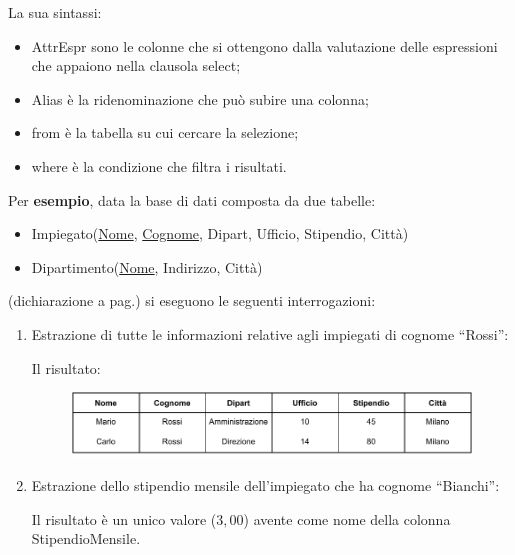 \documentclass[a4paper]{article}
\newcommand{\dquotes}[1]{``#1''}
\begin{document}
	\noindent
	La sua sintassi:
	
	\begin{itemize}
		\item \textsf{AttrEspr} sono le colonne che si ottengono dalla valutazione delle espressioni che appaiono nella clausola \textsf{select};
		\item \textsf{Alias} è la ridenominazione che può subire una colonna;
		\item \textsf{from} è la tabella su cui cercare la selezione;
		\item \textsf{where} è la condizione che filtra i risultati.
	\end{itemize}
	Per \textcolor{Green4}{\textbf{esempio}}, data la base di dati composta da due tabelle:
	\begin{itemize}
		\item \textsf{Impiegato(\underline{Nome}, \underline{Cognome}, Dipart, Ufficio, Stipendio, Città)}
		\item \textsf{Dipartimento(\underline{Nome}, Indirizzo, Città)}
	\end{itemize}
	(dichiarazione a pag.\pageref{select dbms}) si eseguono le seguenti interrogazioni:
	\begin{enumerate}
		\item Estrazione di tutte le informazioni relative agli impiegati di cognome \dquotes{Rossi}:
		
		Il risultato:
		\begin{figure}[!htp]
			\centering
			\includegraphics[width=\textwidth]{img/select-ex1.pdf}
		\end{figure}
		
		\item Estrazione dello stipendio mensile dell'impiegato che ha cognome \dquotes{Bianchi}:
		
		Il risultato è un unico valore ($3,00$) avente come nome della colonna \textsf{StipendioMensile}.
	\end{enumerate}\newpage
\end{document}
